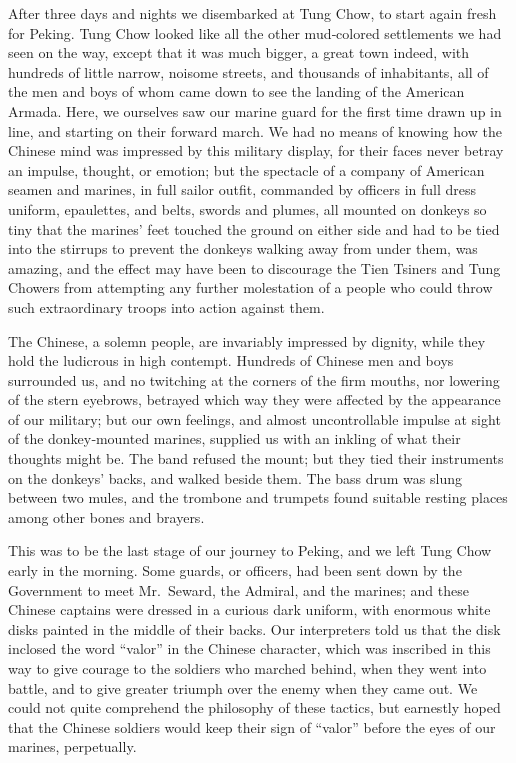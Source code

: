 \documentclass[12pt]{book}
\begin{document}
After three days and nights we disembarked at Tung Chow, to start again
fresh for Peking. Tung Chow looked like all the other mud‐colored settlements
we had seen on the way, except that it was much bigger, a great town indeed,
with hundreds of little narrow, noisome streets, and thousands of inhabitants, all
of the men and boys of whom came down to see the landing of the American
Armada. Here, we ourselves saw our marine guard for the first time drawn up in
line, and starting on their forward march. We had no means of knowing how the
Chinese mind was impressed by this military display, for their faces never betray
an impulse, thought, or emotion; but the spectacle of a company of American
seamen and marines, in full sailor outfit, commanded by officers in full dress
uniform, epaulettes, and belts, swords and plumes, all mounted on donkeys so
tiny that the marines’ feet touched the ground on either side and had to be tied
into the stirrups to prevent the donkeys walking away from under them, was
amazing, and the effect may have been to discourage the Tien Tsiners and Tung
Chowers from attempting any further molestation of a people who could throw
such extraordinary troops into action against them.

The Chinese, a solemn people, are invariably impressed by dignity, while
they hold the ludicrous in high contempt. Hundreds of Chinese men and boys
surrounded us, and no twitching at the corners of the firm mouths, nor lowering
of the stern eyebrows, betrayed which way they were affected by the appearance
of our military; but our own feelings, and almost uncontrollable impulse at sight of
the donkey‐mounted marines, supplied us with an inkling of what their thoughts
might be. The band refused the mount; but they tied their instruments on the
donkeys’ backs, and walked beside them. The bass drum was slung between two
mules, and the trombone and trumpets found suitable resting places among other
bones and brayers.

This was to be the last stage of our journey to Peking, and we left Tung
Chow early in the morning. Some guards, or officers, had been sent down by
the Government to meet Mr.~Seward, the Admiral, and the marines; and these
Chinese captains were dressed in a curious dark uniform, with enormous white
disks painted in the middle of their backs. Our interpreters told us that the disk
inclosed the word “valor” in the Chinese character, which was inscribed in this
way to give courage to the soldiers who marched behind, when they went into
battle, and to give greater triumph over the enemy when they came out. We
could not quite comprehend the philosophy of these tactics, but earnestly hoped
that the Chinese soldiers would keep their sign of “valor” before the eyes of our
marines, perpetually.
\end{document}
